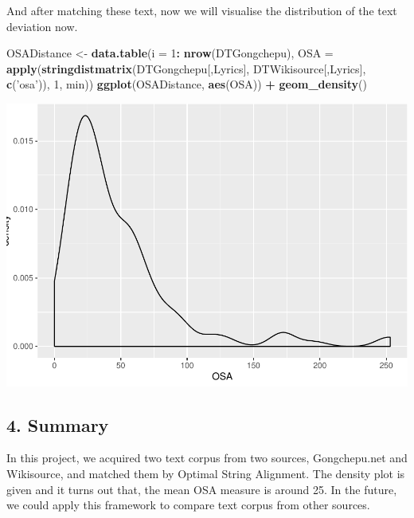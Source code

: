\documentclass[]{article}
\newenvironment{Shaded}{\begin{snugshade}}{\end{snugshade}}
\newcommand{\DataTypeTok}[1]{\textcolor[rgb]{0.13,0.29,0.53}{#1}}
\newcommand{\DecValTok}[1]{\textcolor[rgb]{0.00,0.00,0.81}{#1}}
\newcommand{\KeywordTok}[1]{\textcolor[rgb]{0.13,0.29,0.53}{\textbf{#1}}}
\newcommand{\NormalTok}[1]{#1}
\newcommand{\OperatorTok}[1]{\textcolor[rgb]{0.81,0.36,0.00}{\textbf{#1}}}
\newcommand{\StringTok}[1]{\textcolor[rgb]{0.31,0.60,0.02}{#1}}
\begin{document}
And after matching these text, now we will visualise the distribution of
the text deviation now.

\begin{Shaded}
\begin{Highlighting}[]
\NormalTok{OSADistance <-}
\StringTok{  }\KeywordTok{data.table}\NormalTok{(}\DataTypeTok{i =} \DecValTok{1}\OperatorTok{:}\StringTok{ }\KeywordTok{nrow}\NormalTok{(DTGongchepu),}
             \DataTypeTok{OSA =} \KeywordTok{apply}\NormalTok{(}\KeywordTok{stringdistmatrix}\NormalTok{(DTGongchepu[,Lyrics],}
\NormalTok{                                                  DTWikisource[,Lyrics],}
                                                  \KeywordTok{c}\NormalTok{(}\StringTok{'osa'}\NormalTok{)),}
                                 \DecValTok{1}\NormalTok{, min))}
\KeywordTok{ggplot}\NormalTok{(OSADistance, }\KeywordTok{aes}\NormalTok{(OSA)) }\OperatorTok{+}\StringTok{ }\KeywordTok{geom_density}\NormalTok{()}
\end{Highlighting}
\end{Shaded}

\includegraphics{main_files/figure-latex/unnamed-chunk-11-1.pdf}

\hypertarget{summary}{%
\subsection{4. Summary}\label{summary}}

In this project, we acquired two text corpus from two sources,
Gongchepu.net and Wikisource, and matched them by Optimal String
Alignment. The density plot is given and it turns out that, the mean OSA
measure is around 25. In the future, we could apply this framework to
compare text corpus from other sources.
\end{document}
